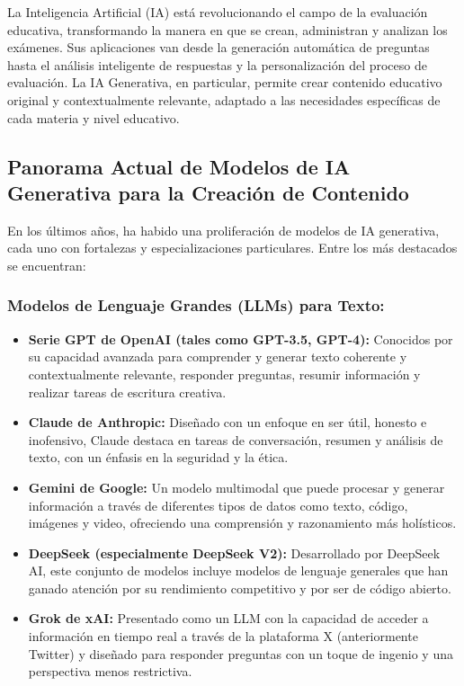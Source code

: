 \documentclass[12pt,a4paper]{report}
\begin{document}
La Inteligencia Artificial (IA) está revolucionando el campo de la evaluación educativa, transformando la manera en que se crean, administran y analizan los exámenes. Sus aplicaciones van desde la generación automática de preguntas hasta el análisis inteligente de respuestas y la personalización del proceso de evaluación. La IA Generativa, en particular, permite crear contenido educativo original y contextualmente relevante, adaptado a las necesidades específicas de cada materia y nivel educativo.

\subsection{Panorama Actual de Modelos de IA Generativa para la Creación de Contenido}

En los últimos años, ha habido una proliferación de modelos de IA generativa, cada uno con fortalezas y especializaciones particulares. Entre los más destacados se encuentran:

\subsubsection{Modelos de Lenguaje Grandes (LLMs) para Texto:}

\begin{itemize}
\item \textbf{Serie GPT de OpenAI (tales como GPT-3.5, GPT-4):} Conocidos por su capacidad avanzada para comprender y generar texto coherente y contextualmente relevante, responder preguntas, resumir información y realizar tareas de escritura creativa.

\item \textbf{Claude de Anthropic:} Diseñado con un enfoque en ser útil, honesto e inofensivo, Claude destaca en tareas de conversación, resumen y análisis de texto, con un énfasis en la seguridad y la ética.

\item \textbf{Gemini de Google:} Un modelo multimodal que puede procesar y generar información a través de diferentes tipos de datos como texto, código, imágenes y video, ofreciendo una comprensión y razonamiento más holísticos.

\item \textbf{DeepSeek (especialmente DeepSeek V2):} Desarrollado por DeepSeek AI, este conjunto de modelos incluye modelos de lenguaje generales que han ganado atención por su rendimiento competitivo y por ser de código abierto.

\item \textbf{Grok de xAI:} Presentado como un LLM con la capacidad de acceder a información en tiempo real a través de la plataforma X (anteriormente Twitter) y diseñado para responder preguntas con un toque de ingenio y una perspectiva menos restrictiva.
\end{itemize}
\end{document}
